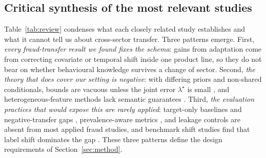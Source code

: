 \documentclass[journal]{IEEEtran}
\newcommand{\1}{\mathbf{1}}
\begin{document}
\subsection{Critical synthesis of the most relevant studies}\label{sec:synthesis}
Table~\ref{tab:review} condenses what each closely related study establishes and what it cannot tell us about cross-sector transfer. Three patterns emerge. First, \emph{every fraud-transfer result we found fixes the schema}: gains from adaptation \cite{lebichot2021transfer,siblini2021transfer,zhu2020hen,pereira2025evaluating,zheng2020federated} come from correcting covariate or temporal shift inside one product line, so they do not bear on whether behavioural knowledge survives a change of sector. Second, \emph{the theory that does cover our setting is negative}: with differing priors and non-shared conditionals, bounds are vacuous unless the joint error $\lambda^\star$ is small \cite{bendavid2010theory,mansour2009domain,zhao2019invariant}, and heterogeneous-feature methods lack semantic guarantees \cite{duan2012hfa}. Third, \emph{the evaluation practices that would expose this are rarely applied}: target-only baselines and negative-transfer gaps \cite{wang2019negative}, prevalence-aware metrics \cite{saito2015pr}, and leakage controls \cite{kapoor2023leakage} are absent from most applied fraud studies, and benchmark shift studies find that label shift dominates the gap \cite{gardner2023tableshift}. These three patterns define the design requirements of Section~\ref{sec:method}.
\end{document}
